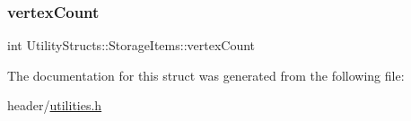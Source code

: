 \subsubsection{\texorpdfstring{vertex\+Count}{vertexCount}}
{\footnotesize\ttfamily int Utility\+Structs\+::\+Storage\+Items\+::vertex\+Count}



The documentation for this struct was generated from the following file\+:\begin{DoxyCompactItemize}
\item 
header/\hyperlink{utilities_8h}{utilities.\+h}\end{DoxyCompactItemize}
